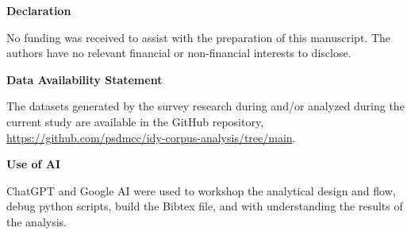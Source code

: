 \documentclass[11pt]{article}
\begin{document}
\textbf{\large Declaration}

No funding was received to assist with the preparation of this manuscript.
The authors have no relevant financial or non-financial interests to disclose.

\textbf{\large Data Availability Statement}

The datasets generated by the survey research during and/or analyzed during the current study are available in the GitHub repository, \url{https://github.com/psdmcc/idy-corpus-analysis/tree/main}.

\textbf{Use of AI}

ChatGPT and Google AI were used to workshop the analytical design and flow, debug python scripts, build the Bibtex file, and with understanding the results of the analysis.



\end{document}

